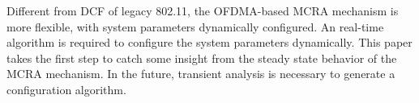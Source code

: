 \documentclass[journal]{IEEEtran}
\begin{document}
Different from DCF of legacy 802.11, the OFDMA-based MCRA mechanism is more flexible, with system parameters dynamically configured.
An real-time algorithm is required to configure the system parameters dynamically. 
This paper takes the first step to catch some insight from the steady state behavior of the MCRA mechanism.
In the future, transient analysis is necessary to generate a configuration algorithm.



%
%
\end{document}
